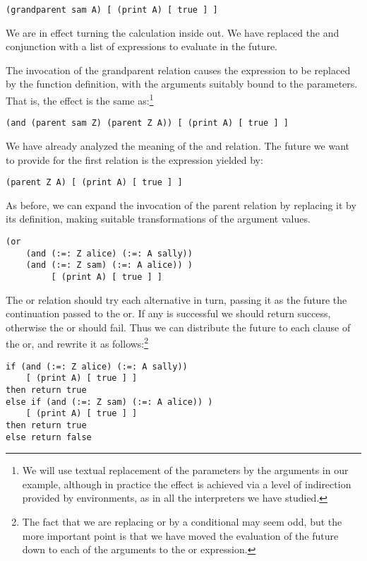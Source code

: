 \begin{lstlisting}
(grandparent sam A) [ (print A) [ true ] ]
\end{lstlisting}

We are in effect turning the calculation inside out.  We have replaced the
{\sf and} conjunction with a list of expressions to evaluate in the future.

The invocation of the {\sf grandparent} relation causes the expression to be
replaced by the function definition, with the arguments suitably bound to the
parameters.  That is, the effect is the same as:\footnote{We will use textual
    replacement of the parameters by the arguments in our example, although in
    practice the effect is achieved via a level of indirection provided by
    environments, as in all the interpreters we have studied.}

\begin{lstlisting}
(and (parent sam Z) (parent Z A)) [ (print A) [ true ] ]
\end{lstlisting}

We have already analyzed the meaning of the {\sf and} relation.  The future we
want to provide for the first relation is the expression yielded by:

\begin{lstlisting}
(parent Z A) [ (print A) [ true ] ]
\end{lstlisting}

As before, we can expand the invocation of the {\sf parent} relation by
replacing it by its definition, making suitable transformations of the argument
values.

\begin{lstlisting}
(or
    (and (:=: Z alice) (:=: A sally))
    (and (:=: Z sam) (:=: A alice)) )
         [ (print A) [ true ] ]
\end{lstlisting}

The {\sf or} relation should try each alternative in turn, passing it as the
future the continuation passed to the or.  If any is successful we should return
success, otherwise the or should fail.  Thus we can distribute the future to
each clause of the or, and rewrite it as follows:\footnote{The fact that we are
    replacing or by a conditional may seem odd, but the more important point is
    that we have moved the evaluation of the future down to each of the
    arguments to the or expression.}

\begin{lstlisting}
if (and (:=: Z alice) (:=: A sally))
    [ (print A) [ true ] ]
then return true
else if (and (:=: Z sam) (:=: A alice)) )
    [ (print A) [ true ] ]
then return true
else return false
\end{lstlisting}

